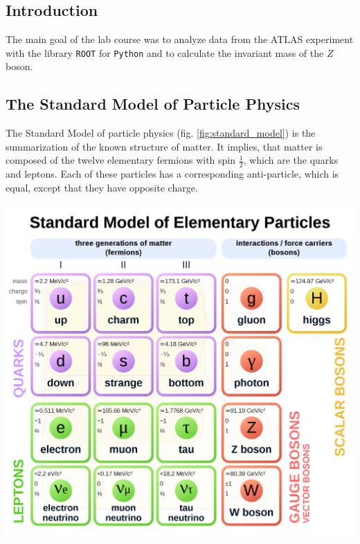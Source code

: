 \documentclass[12pt, a4paper, bibliography=totoc]{scrartcl}
\begin{document}
\begin{multicols}{2}
\section{Introduction}

The main goal of the lab course was to analyze data from the ATLAS experiment with the library \verb*+ROOT+ for \verb*+Python+ and to calculate the invariant mass of the $Z$ boson. 

\subsection{The Standard Model of Particle Physics}

The Standard Model of particle physics (fig. \ref{fig:standard_model}) is the summarization of the known structure of matter.
It implies, that matter is composed of the twelve elementary fermions with spin $\frac{1}{2}$, which are the quarks and leptons. 
Each of these particles has a corresponding anti-particle, which is equal, except that they have opposite charge.

    \begin{center}
\label{fig:standard_model}
    \includegraphics[width=0.9\linewidth]{fig/standard_model.png}
    \end{center}


\end{multicols}
\end{document}
